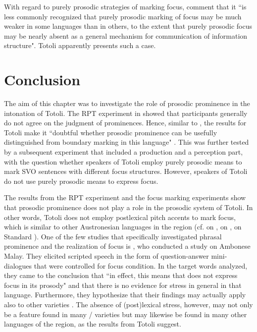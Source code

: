 With regard to purely prosodic strategies of marking focus, \citet[4754]{Lee_2015} comment that it ``is  less  commonly  recognized  that purely  prosodic  marking  of  focus  may  be  much  weaker  in some  languages  than  in  others,  to  the  extent  that  purely prosodic   focus   may   be   nearly absent   as   a   general mechanism for communication of information structure".
Totoli apparently presents such a case. 




\section{Conclusion}\label{sec:conclusion-experiments} 
\largerpage


The aim of this chapter was to investigate the role of prosodic prominence in the intonation of Totoli. The RPT  experiment in  showed that participants generally do not agree on the judgment of prominences. Hence, similar to , the results for Totoli make it ``doubtful whether prosodic prominence can be usefully distinguished from boundary marking in this language" \citep[389]{riesberg2018perception}. This was further tested by a subsequent  experiment that included a production and a perception part, with the question whether speakers of Totoli employ purely prosodic means to mark SVO sentences with different focus structures. However, speakers of Totoli do not use purely prosodic means to express focus. 




The results from the RPT experiment and the focus marking experiments show that prosodic prominence does not play a role in the prosodic system of Totoli. In other words, Totoli does not employ postlexical pitch accents to mark focus, which is similar to other Austronesian languages in the region (cf. \citealt{Maskikit_Essed_2016}  on , \citealt{riesberg2018perception} on ,  \citealt{goedemans2007stress} on Standard ). One of the few studies that specifically investigated phrasal prominence and the realization of focus is \citet{Maskikit_Essed_2016}, who conducted a study on Ambonese Malay. They elicited scripted speech in the form of question-answer mini-dialogues that were controlled for focus condition. In the target words analyzed, they came to the conclusion that ``in effect, this means that  does not express focus in its prosody" \citep[383]{Maskikit_Essed_2016} and that there is no evidence for stress in general in that language.  Furthermore, they hypothesize that their findings may actually apply also to other  varieties  \citet[391]{Maskikit_Essed_2016}.  The absence of (post)lexical stress, however, may not only be a feature found in many / varieties but may likewise be found in many other languages of the region, as the results from Totoli suggest.







